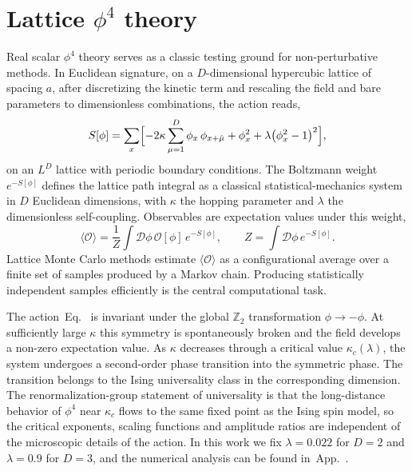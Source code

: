 \documentclass[reprint,twocolumn,superscriptaddress,preprintnumbers,amsmath,amssymb,aps,prd,floatfix]{revtex4-2}
\def\Eq#1{Eq.~\labelcref{#1}} \def\Eqs#1{Eqs.~\labelcref{#1}}
\def\App#1{App.~\labelcref{#1}}
\begin{document}
\section{Lattice $\phi^4$ theory}
\label{sec:phi4_setup}

Real scalar $\phi^4$ theory  serves as a classic testing ground for non-perturbative methods. In Euclidean signature, on a $D$-dimensional hypercubic lattice of spacing $a$, after discretizing the kinetic term and rescaling the field and bare parameters to dimensionless combinations, the action reads,
\begin{equation}
S[\phi] = \sum_{x} \Bigl[
  -2\kappa \sum_{\mu=1}^{D} \phi_x\,\phi_{x+\hat\mu}
  + \phi_x^2 + \lambda\bigl(\phi_x^2 - 1\bigr)^2
\Bigr],
\label{eq:phi4_action}
\end{equation}
on an $L^D$ lattice with periodic boundary conditions. The Boltzmann weight $e^{-S[\phi]}$ defines the lattice path integral as a classical statistical-mechanics system in $D$ Euclidean dimensions, with $\kappa$ the hopping parameter and $\lambda$ the dimensionless self-coupling.
Observables are expectation values under this weight,
\begin{equation}
\langle\mathcal{O}\rangle = \frac{1}{Z}\int\!\mathcal{D}\phi\,\mathcal{O}[\phi]\,e^{-S[\phi]},
\qquad Z=\int\!\mathcal{D}\phi\,e^{-S[\phi]}.
\label{eq:path_integral}
\end{equation}
Lattice Monte Carlo methods estimate $\langle\mathcal{O}\rangle$ as a configurational average over a finite set of samples produced by a Markov chain. Producing statistically independent samples efficiently is the central computational task.

The action~\Eq{eq:phi4_action} is invariant under the global $\mathbb{Z}_2$ transformation $\phi\to -\phi$. At sufficiently large $\kappa$ this symmetry is spontaneously broken and the field develops a non-zero expectation value. As $\kappa$ decreases through a critical value $\kappa_c(\lambda)$, the system undergoes a second-order phase transition into the symmetric phase.
The transition belongs to the Ising universality class in the corresponding dimension. The renormalization-group statement of universality is that the long-distance behavior of $\phi^4$ near $\kappa_c$ flows to the same fixed point as the Ising spin model, so the critical exponents, scaling functions and amplitude ratios are independent of the microscopic details of the action.
In this work we fix $\lambda=0.022$ for $D=2$ and $\lambda=0.9$ for $D=3$, and the numerical analysis can be found in~\App{app:kappac}.
\end{document}
